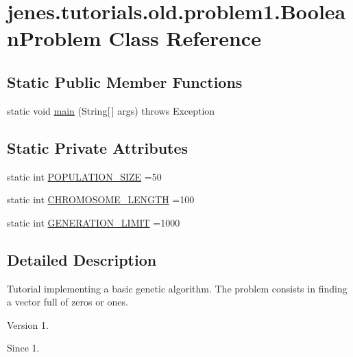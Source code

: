 \hypertarget{classjenes_1_1tutorials_1_1old_1_1problem1_1_1_boolean_problem}{\section{jenes.\-tutorials.\-old.\-problem1.\-Boolean\-Problem Class Reference}
\label{classjenes_1_1tutorials_1_1old_1_1problem1_1_1_boolean_problem}
}
\subsection*{Static Public Member Functions}
\begin{DoxyCompactItemize}
\item 
static void \hyperlink{classjenes_1_1tutorials_1_1old_1_1problem1_1_1_boolean_problem_a122005d28decbbdf9c0676bc5870dfd4}{main} (String\mbox{[}$\,$\mbox{]} args)  throws Exception 
\end{DoxyCompactItemize}
\subsection*{Static Private Attributes}
\begin{DoxyCompactItemize}
\item 
static int \hyperlink{classjenes_1_1tutorials_1_1old_1_1problem1_1_1_boolean_problem_a2e3533716f1eb0515e413d6547f9b7b3}{P\-O\-P\-U\-L\-A\-T\-I\-O\-N\-\_\-\-S\-I\-Z\-E} =50
\item 
static int \hyperlink{classjenes_1_1tutorials_1_1old_1_1problem1_1_1_boolean_problem_a2c993c43a52908b3284a0a74b243a5f1}{C\-H\-R\-O\-M\-O\-S\-O\-M\-E\-\_\-\-L\-E\-N\-G\-T\-H} =100
\item 
static int \hyperlink{classjenes_1_1tutorials_1_1old_1_1problem1_1_1_boolean_problem_a0bcad729c8eff87eac3654342286c4e0}{G\-E\-N\-E\-R\-A\-T\-I\-O\-N\-\_\-\-L\-I\-M\-I\-T} =1000
\end{DoxyCompactItemize}


\subsection{Detailed Description}
Tutorial implementing a basic genetic algorithm. The problem consists in finding a vector full of zeros or ones.

\begin{DoxyVersion}{Version}
1.
\end{DoxyVersion}
\begin{DoxySince}{Since}
1. 
\end{DoxySince}


